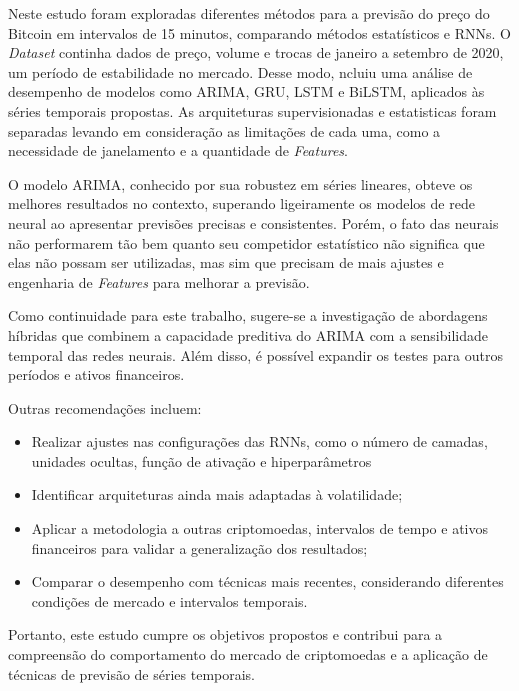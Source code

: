 Neste estudo foram exploradas diferentes métodos para a previsão do preço do Bitcoin em intervalos de 15 minutos, comparando métodos estatísticos e RNNs. 
O \textit{Dataset} continha dados de preço, volume e trocas de janeiro a setembro de 2020, um período de estabilidade no mercado. Desse modo, ncluiu uma análise de desempenho de modelos como ARIMA, GRU, LSTM e BiLSTM, aplicados às séries temporais propostas.
As arquiteturas supervisionadas e estatisticas foram separadas levando em consideração as limitações de cada uma, como a necessidade de janelamento e a quantidade de \textit{Features}.

O modelo ARIMA, conhecido por sua robustez em séries lineares, obteve os melhores resultados no contexto, superando ligeiramente os modelos de rede neural ao apresentar previsões precisas e consistentes.
Porém, o fato das neurais não performarem tão bem quanto seu competidor estatístico não significa que elas não possam ser utilizadas, mas sim que precisam de mais ajustes e engenharia de \textit{Features} para melhorar a previsão.

Como continuidade para este trabalho, sugere-se a investigação de abordagens híbridas que combinem a capacidade preditiva do ARIMA com a sensibilidade temporal das redes neurais. Além disso, é possível expandir os testes para outros períodos e ativos financeiros. 

Outras recomendações incluem:

\begin{itemize}
    \item Realizar ajustes nas configurações das RNNs, como o número de camadas, unidades ocultas, função de ativação e hiperparâmetros
    \item Identificar arquiteturas ainda mais adaptadas à volatilidade;
    \item Aplicar a metodologia a outras criptomoedas, intervalos de tempo e ativos financeiros para validar a generalização dos resultados;
    \item Comparar o desempenho com técnicas mais recentes, considerando diferentes condições de mercado e intervalos temporais.
\end{itemize}

Portanto, este estudo cumpre os objetivos propostos e contribui para a compreensão do comportamento do mercado de criptomoedas e a aplicação de técnicas de previsão de séries temporais.
